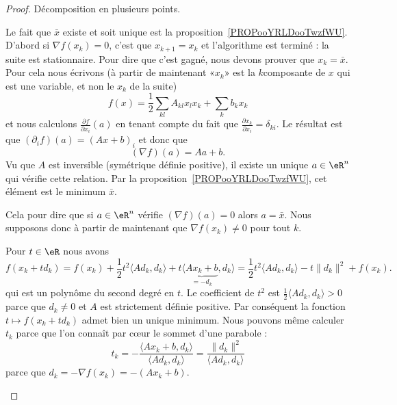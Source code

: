 \begin{proof}
	Décomposition en plusieurs points.
	\begin{subproof}
		Le fait que \( \bar x\) existe et soit unique est la proposition~\ref{PROPooYRLDooTwzfWU}.
		\spitem[Si \( (\nabla f)(x_k)=0\)]
		D'abord si \( \nabla f(x_k)=0\), c'est que \( x_{k+1}=x_k\) et l'algorithme est terminé : la suite est stationnaire. Pour dire que c'est gagné, nous devons prouver que \( x_k=\bar x\). Pour cela nous écrivons (à partir de maintenant «\( x_k\)» est la \( k\)\ieme composante de \( x\) qui est une variable, et non le \( x_k\) de la suite)
		\begin{equation}
			f(x)=\frac{ 1 }{2}\sum_{kl}A_{kl}x_lx_k+\sum_{k}b_kx_k
		\end{equation}
		et nous calculons \( \frac{ \partial f }{ \partial x_i }(a)\) en tenant compte du fait que \( \frac{ \partial x_k }{ \partial x_i }=\delta_{ki}\). Le résultat est que \( (\partial_if)(a)=(Ax+b)_i\) et donc que
		\begin{equation}
			(\nabla f)(a)=Aa+b.
		\end{equation}
		Vu que \( A\) est inversible (symétrique définie positive), il existe un unique \( a\in \eR^n\) qui vérifie cette relation. Par la proposition~\ref{PROPooYRLDooTwzfWU}, cet élément est le minimum \( \bar x\).

		Cela pour dire que si \( a\in \eR^n\) vérifie \( (\nabla f)(a)=0\) alors \( a=\bar x\). Nous supposons donc à partir de maintenant que \( \nabla f(x_k)\neq 0\) pour tout \( k\).

		Pour \( t\in \eR\) nous avons
		\begin{equation}    \label{EqKEHooYaazQi}
			f(x_k+td_k)=f(x_k)+\frac{ 1 }{2}t^2\langle Ad_k, d_k\rangle +t\langle \underbrace{Ax_k+b}_{=-d_k}, d_k\rangle=\frac{ 1 }{2}t^2\langle Ad_k, d_k\rangle -t\| d_k \|^2 +f(x_k).
		\end{equation}
		qui est un polynôme du second degré en \( t\). Le coefficient de \( t^2\) est \( \frac{ 1 }{2}\langle Ad_k, d_k\rangle >0\) parce que \( d_k\neq 0\) et \( A\) est strictement définie positive. Par conséquent la fonction \( t\mapsto f(x_k+td_k)\) admet bien un unique minimum. Nous pouvons même calculer \( t_k\) parce que l'on connaît par cœur le sommet d'une parabole :
		\begin{equation}    \label{EqVWJooWmDSER}
			t_k=-\frac{ \langle Ax_k+b, d_k\rangle  }{ \langle Ad_k, d_k\rangle  }=\frac{ \| d_k \|^2 }{ \langle Ad_k, d_k\rangle  }
		\end{equation}
		parce que \( d_k=-\nabla f(x_k)=-(Ax_k+b)\).


\end{subproof}
\end{proof}
